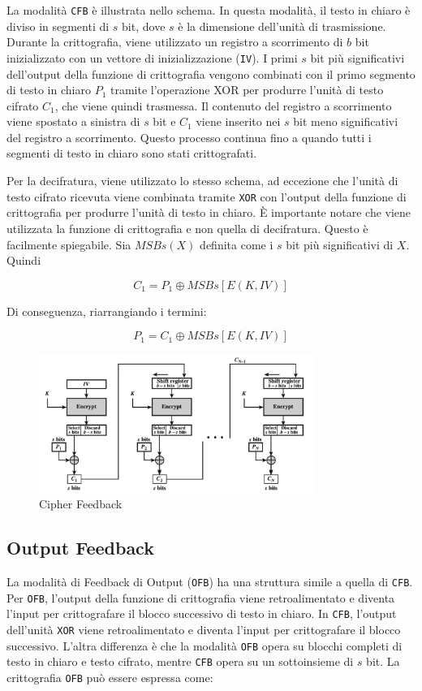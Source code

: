 La modalità \verb|CFB| è illustrata nello schema. In questa modalità, il testo in chiaro
è diviso in segmenti di \(s\) bit, dove \(s\) è la dimensione dell'unità di
trasmissione. Durante la crittografia, viene utilizzato un registro a scorrimento
di \(b\) bit inizializzato con un vettore di inizializzazione (\verb|IV|). I
primi \(s\) bit più significativi dell'output della funzione di crittografia
vengono combinati con il primo segmento di testo in chiaro \(P_1\) tramite
l'operazione XOR per produrre l'unità di testo cifrato \(C_1\), che viene quindi
trasmessa. Il contenuto del registro a scorrimento viene spostato a sinistra di
\(s\) bit e \(C_1\) viene inserito nei \(s\) bit meno significativi del registro
a scorrimento. Questo processo continua fino a quando tutti i segmenti di testo
in chiaro sono stati crittografati.

Per la decifratura, viene utilizzato lo stesso schema, ad eccezione che l'unità
di testo cifrato ricevuta viene combinata tramite \verb|XOR| con l'output della funzione
di crittografia per produrre l'unità di testo in chiaro. È importante notare che
viene utilizzata la funzione di crittografia e non quella di decifratura. Questo
è facilmente spiegabile. Sia \(MSBs(X)\) definita come i \(s\) bit più significativi
di \(X\). Quindi

\[ C_1 = P_1 \oplus MSBs[E(K, IV)] \]

Di conseguenza, riarrangiando i termini:

\[ P_1 = C_1 \oplus MSBs[E(K, IV)] \]
\begin{figure}[H]
    \centering
    \includegraphics[width=0.8\textwidth]{img/cipherFeedback.png}
    \caption{Cipher Feedback}
\end{figure}
\subsection{Output Feedback}
La modalità di Feedback di Output (\verb|OFB|) ha una struttura simile a
quella di \verb|CFB|. Per \verb|OFB|, l'output della funzione di crittografia viene
retroalimentato e diventa l'input per crittografare il blocco successivo
di testo in chiaro. In \verb|CFB|, l'output dell'unità \verb|XOR| viene
retroalimentato e diventa l'input per crittografare il blocco successivo.
L'altra differenza è che la modalità \verb|OFB| opera su blocchi completi
di testo
in chiaro e testo cifrato, mentre \verb|CFB| opera su un sottoinsieme di \(s\) bit.
La crittografia \verb|OFB| può essere espressa come:

